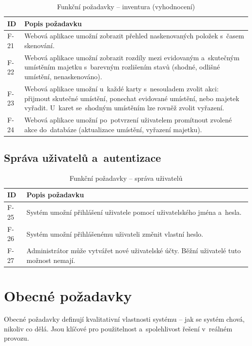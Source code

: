 \begin{table}[H]\centering
\renewcommand{\arraystretch}{1.4}
\caption{Funkční požadavky -- inventura (vyhodnocení)}\label{tab:freq-inventory-web}
\begin{tabular}{l|p{10cm}}
	\textbf{ID} & \textbf{Popis požadavku} \tabularnewline \hline
	F-21 & Webová aplikace umožní zobrazit přehled naskenovaných položek s~časem skenování. \tabularnewline
	F-22 & Webová aplikace umožní zobrazit rozdíly mezi evidovaným a~skutečným umístěním majetku s~barevným rozlišením stavů (shodné, odlišné umístění, nenaskenováno). \tabularnewline
	F-23 & Webová aplikace umožní u~každé karty s~nesouladem zvolit akci: přijmout skutečné umístění, ponechat evidované umístění, nebo majetek vyřadit. U~karet se~shodným umístěním lze rovněž zvolit vyřazení. \tabularnewline
	F-24 & Webová aplikace umožní po~potvrzení uživatelem promítnout zvolené akce do~databáze (aktualizace umístění, vyřazení majetku). \tabularnewline
\end{tabular}
\end{table}

\subsection{Správa uživatelů a~autentizace}

\begin{table}[H]\centering
\renewcommand{\arraystretch}{1.4}
\caption{Funkční požadavky -- správa uživatelů}\label{tab:freq-users}
\begin{tabular}{l|p{10cm}}
	\textbf{ID} & \textbf{Popis požadavku} \tabularnewline \hline
	F-25 & Systém umožní přihlášení uživatele pomocí uživatelského jména a~hesla. \tabularnewline
	F-26 & Systém umožní přihlášenému uživateli změnit vlastní heslo. \tabularnewline
	F-27 & Administrátor může vytvářet nové uživatelské účty. Běžní uživatelé tuto možnost nemají. \tabularnewline
\end{tabular}
\end{table}

\clearpage
\section{Obecné požadavky}

Obecné požadavky definují kvalitativní vlastnosti systému -- jak se systém chová, nikoliv co dělá. Jsou klíčové pro použitelnost a~spolehlivost řešení v~reálném provozu.

